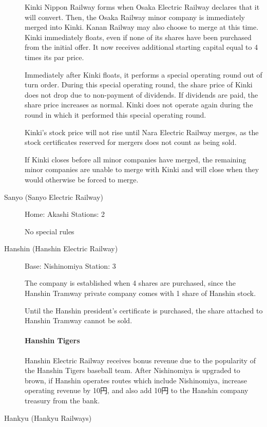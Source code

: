 \documentclass{article}
\begin{document}
\begin{CJK}{UTF8}{min}
\begin{multicols}{2}
\begin{description}
Kinki Nippon Railway forms when Osaka Electric Railway declares that
it will convert. Then, the Osaka Railway minor company is immediately
merged into Kinki. Kanan Railway may also choose to merge at this
time. Kinki immediately floats, even if none of its shares have been
purchased from the initial offer. It now receives additional starting
capital equal to 4 times its par price.

Immediately after Kinki floats, it performs a special operating round
out of turn order. During this special operating round, the share
price of Kinki does not drop due to non-payment of dividends. If
dividends are paid, the share price increases as normal. Kinki does
not operate again during the round in which it performed this special
operating round.

Kinki's stock price will not rise until Nara Electric Railway merges,
as the stock certificates reserved for mergers does not count as being
sold.

If Kinki closes before all minor companies have merged, the remaining
minor companies are unable to merge with Kinki and will close when they would
otherwise be forced to merge.

\item[Sanyo (Sanyo Electric Railway)] \hfill

Home: Akashi \hfill Stations: 2

No special rules

\item[Hanshin (Hanshin Electric Railway)] \hfill

Base: Nishinomiya Station: 3

The company is established when 4 shares are purchased, since the
Hanshin Tramway private company comes with 1 share of Hanshin stock.

Until the Hanshin president's certificate is purchased, the share
attached to Hanshin Tramway cannot be sold.

\paragraph{Hanshin Tigers}
Hanshin Electric Railway receives bonus revenue due to the popularity
of the Hanshin Tigers baseball team. After Nishinomiya is upgraded to
brown, if Hanshin operates routes which include Nishinomiya, increase
operating revenue by 10円, and also add 10円 to the Hanshin company
treasury from the bank.

\item[Hankyu (Hankyu Railways)] \hfill


\end{description}
\end{multicols}
\end{CJK}
\end{document}
